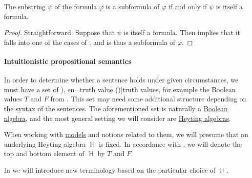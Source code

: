 \begin{proposition}\label{thm:propositional_formula_characterization}
  The \hyperref[def:formal_language/substring]{substring} \( \psi \) of the formula \( \varphi \) is a \hyperref[def:propositional_subformula]{subformula} of \( \varphi \) if and only if \( \psi \) is itself a formula.
\end{proposition}
\begin{proof}
  \SufficiencySubProof Straightforward.
  \NecessitySubProof Suppose that \( \psi \) is itself a formula. Then  implies that it falls into one of the cases of , and is thus a subformula of \( \varphi \).
\end{proof}

\paragraph{Intuitionistic propositional semantics}

\begin{definition}\label{def:truth_value_algebra}
  In order to determine whether a sentence holds under given circumstances, we must have a set of \term[ru=истинностное значение (\cite[17]{Герасимов2011}), en=truth value (\cite[9]{Smullyan1995})]{truth values}, for example the Boolean values \( T \) and \( F \) from . This set may need some additional structure depending on the syntax of the sentences. The aforementioned set is naturally a \hyperref[def:boolean_algebra]{Boolean algebra}, and the most general setting we will consider are \hyperref[def:heyting_algebra]{Heyting algebras}.

  When working with \hyperref[def:institution/models]{models} and notions related to them, we will presume that an underlying Heyting algebra \( \BbbH \) is fixed. In accordance with , we will denote the top and bottom element of \( \BbbH \) by \( T \) and \( F \).
\end{definition}
\begin{comments}
  \item In  we will introduce new terminology based on the particular choice of \( \BbbH \).
\end{comments}

